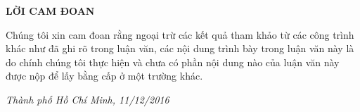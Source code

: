 \begin{titlepage}
\centering
	{\scshape\LARGE \textbf{LỜI CAM ĐOAN} \par}
	\vspace{1cm}
	
\begin{flushleft}
Chúng tôi xin cam đoan rằng ngoại trừ các kết quả tham khảo từ các công trình khác
như đã ghi rõ trong luận văn, các nội dung trình bày trong luận văn này là do chính chúng tôi
thực hiện và chưa có phần nội dung nào của luận văn này được nộp để lấy bằng cấp ở một
trường khác. \par
\end{flushleft}

\begin{flushright}
\emph{Thành phố Hồ Chí Minh, 11/12/2016}
\end{flushright}


\vfill %
\end{titlepage}